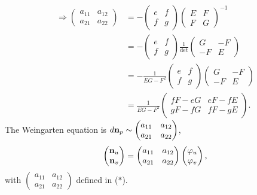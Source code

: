 \begin{align*}
    \Rightarrow
    \begin{pmatrix}
        a_{11}&a_{12}\\
        a_{21}&a_{22}
    \end{pmatrix}
    &=-\begin{pmatrix}
        e&f\\
        f&g
    \end{pmatrix}
    \begin{pmatrix}
        E&F\\
        F&G
    \end{pmatrix}^{-1}\\
    &=-\begin{pmatrix}
        e&f\\
        f&g
    \end{pmatrix}
    \frac{1}{\det}\begin{pmatrix}
        G&-F\\
        -F&E
    \end{pmatrix}\\
    &=-\frac{1}{EG-F^2}\begin{pmatrix}
        e&f\\
        f&g
    \end{pmatrix}
    \begin{pmatrix}
        G&-F\\
        -F&E
    \end{pmatrix}\\
    &=\frac{1}{EG-F^2}\begin{pmatrix}
        fF-eG& e F-fE\\
        gF-fG& fF-gE
    \end{pmatrix}\tag{\(\ast \)}.
\end{align*}
The Weingarten equation is \(d \vb{n}_p\sim \begin{pmatrix}
    a_{11}&a_{12}\\
    a_{21}&a_{22}
\end{pmatrix}\),
\ie\ 
\[
    \begin{pmatrix}
        \vb{n}_u\\
        \vb{n}_v
    \end{pmatrix}=
    \begin{pmatrix}
        a_{11}&a_{12}\\
        a_{21}&a_{22}
    \end{pmatrix}
    \begin{pmatrix}
        \varphi_u\\
        \varphi_v
    \end{pmatrix},
\]
with \(\begin{pmatrix}
    a_{11}&a_{12}\\
    a_{21}&a_{22}
\end{pmatrix}\) defined in (\(\ast\)).

